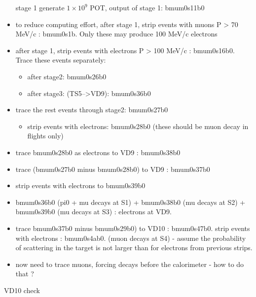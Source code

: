\documentclass[12pt]{article}
\begin{document}
\begin{itemize}
\item [stage 1]
  generate $1 \times 10^9$ POT, output of stage 1: bmum0s11b0
\item
  to reduce computing effort,
  after stage 1, strip events with muons P > 70 MeV/c : bmum0s1b. 
  Only these may produce 100 MeV/c electrons
\item
  after stage 1, strip events with electrons P > 100 MeV/c : bmum0s16b0. Trace these events separately:
  \begin{itemize}
  \item
    after stage2: bmum0s26b0
  \item
    after stage3: (TS5-->VD9): bmum0s36b0
  \end{itemize}
\item
  trace the rest events through stage2: bmum0s27b0
  \begin{itemize}
  \item
    strip events with electrons: bmum0s28b0 (these should be muon decay in flights only)
  \end{itemize}
\item
  trace bmum0s28b0 as electrons to VD9 :  bmum0s38b0
\item
  trace (bmum0s27b0 minus bmum0s28b0) to VD9 : bmum0s37b0
\item
  strip events with electrons to bmum0s39b0
\item
  bmum0s36b0 (pi0 + mu decays at S1) + bmum0s38b0 (mu decays at S2) + bmum0s39b0 (mu decays at S3) : electrons at VD9.
\item
  trace bmum0s37b0 minus bmum0s29b0) to VD10 : bmum0s47b0.
  strip events with electrons : bmum0s4ab0. (muon decays at S4) - assume the probability of
  scattering in the target is not larger than for electrons from previous strips.
\item
  now need to trace muons, forcing decays before the calorimeter - how to do that ? 
\end{itemize}

 VD10 check 
\end{document}
